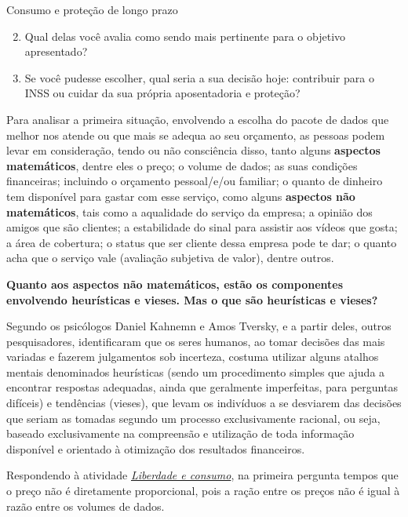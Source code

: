 \begin{task}{Consumo e proteção de longo prazo}
\begin{enumerate}\setcounter{enumi}{1}
  \item Qual delas você avalia como sendo mais pertinente para o objetivo apresentado?
  \item Se você pudesse escolher, qual seria a sua decisão hoje: contribuir para o INSS ou cuidar da sua própria aposentadoria e proteção?
\end{enumerate}
\end{task}


Para analisar a primeira situação, envolvendo a escolha do pacote de dados que melhor nos atende ou que mais se adequa ao seu orçamento, as pessoas podem levar em consideração, tendo ou não consciência disso, tanto alguns \textbf{aspectos matemáticos}, dentre eles o preço; o volume de dados; as suas condições financeiras; incluindo o orçamento pessoal/e/ou familiar; o quanto de dinheiro tem disponível para gastar com esse serviço, como alguns \textbf{aspectos não matemáticos}, tais como a aqualidade do serviço da empresa; a opinião dos amigos que são clientes; a estabilidade do sinal para assistir aos vídeos que gosta; a área de cobertura; o status que ser cliente dessa empresa pode te dar; o quanto acha que o serviço vale (avaliação subjetiva de valor), dentre outros. 

\textbf{Quanto aos aspectos não matemáticos, estão os componentes envolvendo heurísticas e vieses. Mas o que são heurísticas e vieses?}

Segundo os psicólogos Daniel Kahnemn e Amos Tversky, e a partir deles, outros pesquisadores, identificaram que os seres humanos, ao tomar decisões das mais variadas e fazerem julgamentos sob incerteza, costuma utilizar alguns atalhos mentais denominados heurísticas (sendo um procedimento simples que ajuda a encontrar respostas adequadas, ainda que geralmente imperfeitas, para perguntas difíceis) e tendências (vieses), que levam os indivíduos a se desviarem das decisões que seriam as tomadas segundo um processo exclusivamente racional, ou seja, baseado exclusivamente na compreensão e utilização de toda informação disponível e orientado à otimização dos resultados financeiros.

Respondendo à atividade \hyperref[liberdade-consumo]{\textit{Liberdade e consumo}}, na primeira pergunta tempos que o preço não é diretamente proporcional, pois a ração entre os preços não é igual à razão entre os volumes de dados.

